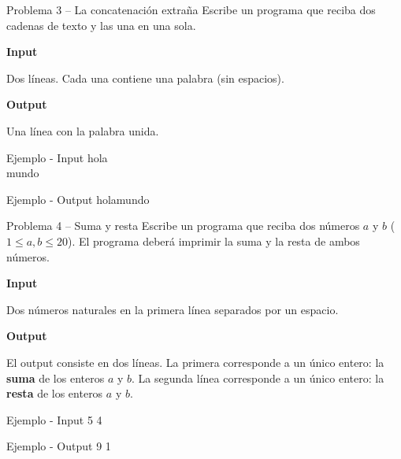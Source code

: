 \documentclass{article}
\begin{document}
\begin{container}{Problema 3 – La concatenación extraña}
Escribe un programa que reciba dos cadenas de texto y las una en una sola.
\end{container}


\textbf{Input}

Dos líneas. Cada una contiene una palabra (sin espacios).

\vspace{0.5em}
\textbf{Output}

Una línea con la palabra unida.

\vspace{0.5em}

\begin{container}{Ejemplo - Input}
hola\\
mundo
\end{container}

\begin{container}{Ejemplo - Output}
holamundo
\end{container}

\vspace{3.5em}


\begin{container}{Problema 4 – Suma y resta}
Escribe un programa que reciba dos números $a$ y $b$ ($1 \leq a,b \leq 20$). El programa deberá imprimir la suma y la resta de ambos números.
\end{container}

\textbf{Input}

Dos números naturales en la primera línea separados por un espacio.

\vspace{0.5em}
\textbf{Output}

El output consiste en dos líneas. La primera corresponde a un único entero: la \textbf{suma} de los enteros $a$ y $b$.
La segunda línea corresponde a un único entero: la \textbf{resta} de los enteros $a$ y $b$.

\vspace{0.5em}

\begin{container}{Ejemplo - Input}
5 4
\end{container}

\begin{container}{Ejemplo - Output}
9
1
\end{container}
\end{document}
